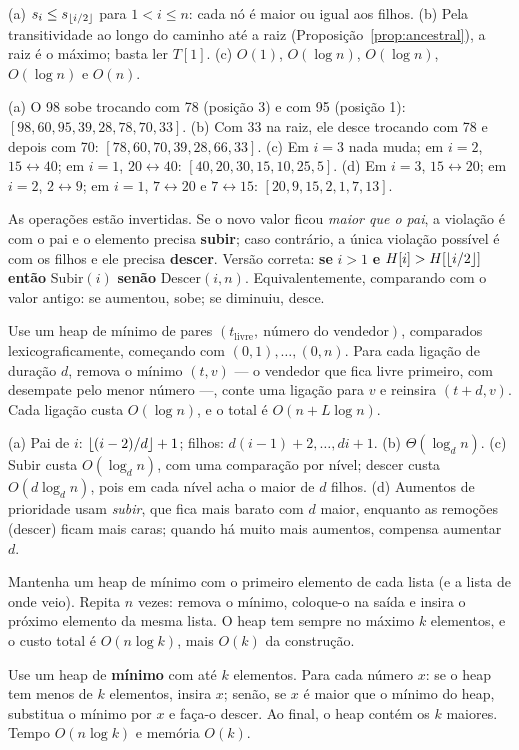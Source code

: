  (a) $s_i\le s_{\lfloor i/2\rfloor}$ para $1<i\le n$: cada nó é maior ou igual aos filhos. (b) Pela transitividade ao longo do caminho até a raiz (Proposição~\ref{prop:ancestral}), a raiz é o máximo; basta ler $T[1]$. (c) $O(1)$, $O(\log n)$, $O(\log n)$, $O(\log n)$ e $O(n)$.

 (a) O 98 sobe trocando com 78 (posição 3) e com 95 (posição 1): $[98,60,95,39,28,78,70,33]$. (b) Com 33 na raiz, ele desce trocando com 78 e depois com 70: $[78,60,70,39,28,66,33]$. (c) Em $i=3$ nada muda; em $i=2$, $15\leftrightarrow40$; em $i=1$, $20\leftrightarrow40$: $[40,20,30,15,10,25,5]$. (d) Em $i=3$, $15\leftrightarrow20$; em $i=2$, $2\leftrightarrow9$; em $i=1$, $7\leftrightarrow20$ e $7\leftrightarrow15$: $[20,9,15,2,1,7,13]$.

 As operações estão invertidas. Se o novo valor ficou \emph{maior que o pai}, a violação é com o pai e o elemento precisa \textbf{subir}; caso contrário, a única violação possível é com os filhos e ele precisa \textbf{descer}. Versão correta: \textbf{se} $i>1$ \textbf{e} $H[i]>H[\lfloor i/2\rfloor]$ \textbf{então} Subir$(i)$ \textbf{senão} Descer$(i,n)$. Equivalentemente, comparando com o valor antigo: se aumentou, sobe; se diminuiu, desce.

 Use um heap de mínimo de pares $(t_{\text{livre}},\ \text{número do vendedor})$, comparados lexicograficamente, começando com $(0,1),\dots,(0,n)$. Para cada ligação de duração $d$, remova o mínimo $(t,v)$ --- o vendedor que fica livre primeiro, com desempate pelo menor número ---, conte uma ligação para $v$ e reinsira $(t+d,v)$. Cada ligação custa $O(\log n)$, e o total é $O(n+L\log n)$.

 (a) Pai de $i$: $\lfloor(i-2)/d\rfloor+1$; filhos: $d(i-1)+2,\dots,di+1$. (b) $\Theta(\log_dn)$. (c) Subir custa $O(\log_dn)$, com uma comparação por nível; descer custa $O(d\log_dn)$, pois em cada nível acha o maior de $d$ filhos. (d) Aumentos de prioridade usam \emph{subir}, que fica mais barato com $d$ maior, enquanto as remoções (descer) ficam mais caras; quando há muito mais aumentos, compensa aumentar $d$.

 Mantenha um heap de mínimo com o primeiro elemento de cada lista (e a lista de onde veio). Repita $n$ vezes: remova o mínimo, coloque-o na saída e insira o próximo elemento da mesma lista. O heap tem sempre no máximo $k$ elementos, e o custo total é $O(n\log k)$, mais $O(k)$ da construção.

 Use um heap de \textbf{mínimo} com até $k$ elementos. Para cada número $x$: se o heap tem menos de $k$ elementos, insira $x$; senão, se $x$ é maior que o mínimo do heap, substitua o mínimo por $x$ e faça-o descer. Ao final, o heap contém os $k$ maiores. Tempo $O(n\log k)$ e memória $O(k)$.

